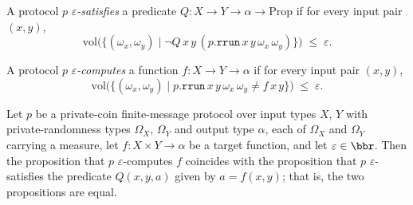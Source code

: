\begin{definition}
\label{CommunicationComplexity.PrivateCoin.FiniteMessage.Protocol.ApproxSatisfies}
\leanok
{}
A protocol $p$ \emph{$\varepsilon$-satisfies} a predicate $Q : X \to Y \to \alpha \to
\mathrm{Prop}$ if for every input pair $(x, y)$,
\[
  \mathrm{vol}\bigl(\{(\omega_x, \omega_y) \mid \neg Q\,x\,y\,(p.\texttt{rrun}\,x\,y\,\omega_x\,\omega_y)\}\bigr) \;\le\; \varepsilon.
\]
\end{definition}

\begin{definition}
\label{CommunicationComplexity.PrivateCoin.FiniteMessage.Protocol.ApproxComputes}
\leanok
{}
A protocol $p$ \emph{$\varepsilon$-computes} a function $f : X \to Y \to \alpha$ if
for every input pair $(x, y)$,
\[
  \mathrm{vol}\bigl(\{(\omega_x, \omega_y) \mid p.\texttt{rrun}\,x\,y\,\omega_x\,\omega_y \ne f\,x\,y\}\bigr) \;\le\; \varepsilon.
\]
\end{definition}

\begin{theorem}
\label{CommunicationComplexity.PrivateCoin.FiniteMessage.Protocol.ApproxComputes_eq_ApproxSatisfies}
\leanok
{}
Let $p$ be a private-coin finite-message protocol over input types $X$, $Y$ with
private-randomness types $\Omega_X$, $\Omega_Y$ and output type $\alpha$, each of
$\Omega_X$ and $\Omega_Y$ carrying a measure, let $f : X \times Y \to \alpha$ be a
target function, and let $\varepsilon \in \bbr$. Then the proposition that $p$
$\varepsilon$-computes $f$ coincides with the proposition that $p$
$\varepsilon$-satisfies the predicate $Q(x,y,a)$ given by $a = f(x,y)$; that is, the two
propositions are equal.
\end{theorem}

